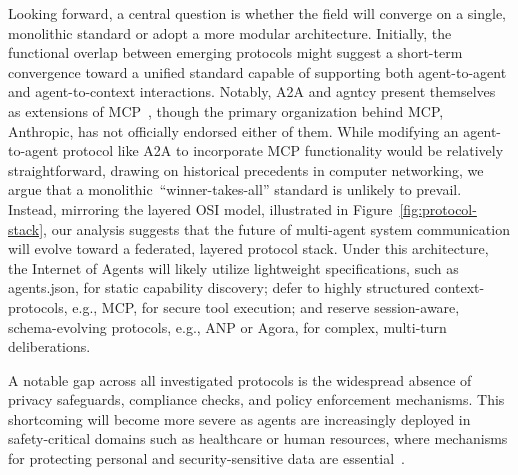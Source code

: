 \documentclass[pdflatex,sn-mathphys-num]{sn-jnl}%
\theoremstyle{thmstyleone}%
\theoremstyle{thmstyletwo}%
\theoremstyle{thmstylethree}%
\begin{document}
Looking forward, a central question is whether the field will converge on a single, monolithic standard or adopt a more modular architecture. Initially, the functional overlap between emerging protocols might suggest a short-term convergence toward a unified standard capable of supporting both agent-to-agent and agent-to-context interactions. Notably, A2A and agntcy present themselves as extensions of MCP~\cite{a2adocsmcp,agntcyintroduction}, though the primary organization behind MCP, Anthropic, has not officially endorsed either of them. 
While modifying an agent-to-agent protocol like A2A to incorporate MCP functionality would be relatively straightforward, drawing on historical precedents in computer networking, we argue that a monolithic~\enquote{winner-takes-all} standard is unlikely to prevail. Instead, mirroring the layered OSI model, illustrated in Figure~\ref{fig:protocol-stack}, our analysis suggests that the future of multi-agent system communication will evolve toward a federated, layered protocol stack. Under this architecture, the Internet of Agents will likely utilize lightweight specifications, such as agents.json, for static capability discovery; defer to highly structured context-protocols, e.g., MCP, for secure tool execution; and reserve session-aware, schema-evolving protocols, e.g., ANP or Agora, for complex, multi-turn deliberations.

A notable gap across all investigated protocols is the widespread absence of privacy safeguards, compliance checks, and policy enforcement mechanisms. This shortcoming will become more severe as agents are increasingly deployed in safety-critical domains such as healthcare or human resources, where mechanisms for protecting personal and security-sensitive data are essential~\cite{guo2024large}.
\end{document}
